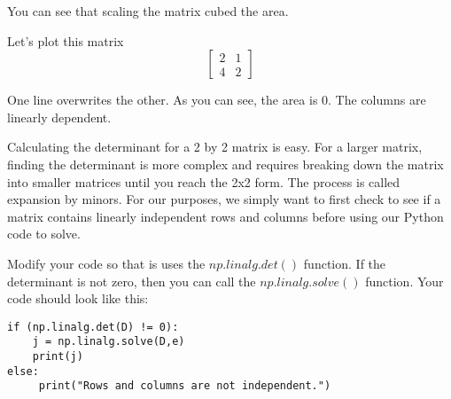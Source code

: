 You can see that scaling the matrix cubed the area.

 
Let's plot this matrix
$$
\begin{bmatrix}
2 & 1  \\
4 & 2 
\end{bmatrix}
$$


One line overwrites the other. As you can see, the area is 0. The columns are linearly dependent.

Calculating the determinant for a 2 by 2 matrix is easy. For a larger matrix, finding the determinant is more complex and requires breaking down the matrix into smaller matrices until you reach the 2x2 form. The process is called expansion by minors. For our purposes, we simply want to first check to see if a matrix contains linearly independent rows and columns before using our Python code to solve. 

Modify your code so that is uses the $np.linalg.det()$ function. If the determinant is not zero, then you can call the $np.linalg.solve()$ function. Your code should look like this:
\begin{Verbatim}
if (np.linalg.det(D) != 0):
    j = np.linalg.solve(D,e)
    print(j)
else:
     print("Rows and columns are not independent.")
\end{Verbatim}

